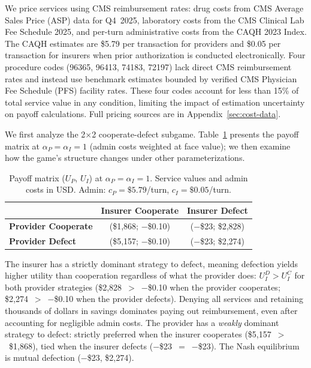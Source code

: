 We price services using CMS reimbursement rates: drug costs from CMS Average Sales Price (ASP) data for Q4~2025, laboratory costs from the CMS Clinical Lab Fee Schedule 2025, and per-turn administrative costs from the CAQH 2023 Index. The CAQH estimates are \$5.79 per transaction for providers and \$0.05 per transaction for insurers when prior authorization is conducted electronically. Four procedure codes (96365, 96413, 74183, 72197) lack direct CMS reimbursement rates and instead use benchmark estimates bounded by verified CMS Physician Fee Schedule (PFS) facility rates. These four codes account for less than 15\% of total service value in any condition, limiting the impact of estimation uncertainty on payoff calculations. Full pricing sources are in Appendix~\ref{sec:cost-data}.

We first analyze the 2$\times$2 cooperate-defect subgame. Table~\ref{tab:payoff} presents the payoff matrix at $\alpha_P = \alpha_I = 1$ (admin costs weighted at face value); we then examine how the game's structure changes under other parameterizations.

\begin{table}[t]
\centering
\caption{Payoff matrix ($U_P$, $U_I$) at $\alpha_P = \alpha_I = 1$. Service values and admin costs in USD. Admin: $c_P = \$5.79$/turn, $c_I = \$0.05$/turn.}
\label{tab:payoff}
\begin{tabular}{lcc}
\toprule
 & \textbf{Insurer Cooperate} & \textbf{Insurer Defect} \\
\midrule
\textbf{Provider Cooperate} & (\$1,868; $-$\$0.10) & ($-$\$23; \$2,828) \\
\textbf{Provider Defect} & (\$5,157; $-$\$0.10) & ($-$\$23; \$2,274) \\
\bottomrule
\end{tabular}
\end{table}

The insurer has a strictly dominant strategy to defect, meaning defection yields higher utility than cooperation regardless of what the provider does: $U_I^D > U_I^C$ for both provider strategies (\$2,828~$>$~$-$\$0.10 when the provider cooperates; \$2,274~$>$~$-$\$0.10 when the provider defects). Denying all services and retaining thousands of dollars in savings dominates paying out reimbursement, even after accounting for negligible admin costs. The provider has a \emph{weakly} dominant strategy to defect: strictly preferred when the insurer cooperates (\$5,157~$>$~\$1,868), tied when the insurer defects ($-$\$23~$=$~$-$\$23). The Nash equilibrium is mutual defection ($-$\$23, \$2,274).

